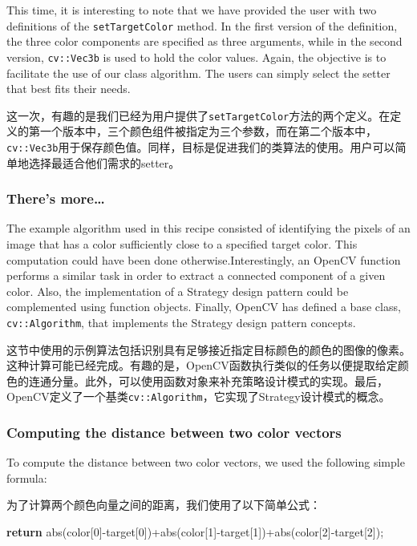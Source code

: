 \documentclass[]{article}
\newenvironment{Shaded}{}{}
\newcommand{\ControlFlowTok}[1]{\textcolor[rgb]{0.00,0.44,0.13}{\textbf{#1}}}
\newcommand{\DecValTok}[1]{\textcolor[rgb]{0.25,0.63,0.44}{#1}}
\newcommand{\NormalTok}[1]{#1}
\begin{document}
This time, it is interesting to note that we have provided the user with
two definitions of the \texttt{setTargetColor} method. In the first
version of the definition, the three color components are specified as
three arguments, while in the second version, \texttt{cv::Vec3b} is used
to hold the color values. Again, the objective is to facilitate the use
of our class algorithm. The users can simply select the setter that best
fits their needs.

这一次，有趣的是我们已经为用户提供了\texttt{setTargetColor}方法的两个定义。在定义的第一个版本中，三个颜色组件被指定为三个参数，而在第二个版本中，\texttt{cv::Vec3b}用于保存颜色值。同样，目标是促进我们的类算法的使用。用户可以简单地选择最适合他们需求的setter。

\hypertarget{header-n1211}{%
\subsubsection{There's more\ldots{}}\label{header-n1211}}

The example algorithm used in this recipe consisted of identifying the
pixels of an image that has a color sufficiently close to a specified
target color. This computation could have been done
otherwise.Interestingly, an OpenCV function performs a similar task in
order to extract a connected component of a given color. Also, the
implementation of a Strategy design pattern could be complemented using
function objects. Finally, OpenCV has defined a base class,
\texttt{cv::Algorithm}, that implements the Strategy design pattern
concepts.

这节中使用的示例算法包括识别具有足够接近指定目标颜色的颜色的图像的像素。这种计算可能已经完成。有趣的是，OpenCV函数执行类似的任务以便提取给定颜色的连通分量。此外，可以使用函数对象来补充策略设计模式的实现。最后，OpenCV定义了一个基类\texttt{cv::Algorithm}，它实现了Strategy设计模式的概念。

\hypertarget{header-n1214}{%
\subsubsection{Computing the distance between two color vectors
}\label{header-n1214}}

To compute the distance between two color vectors, we used the following
simple formula:

为了计算两个颜色向量之间的距离，我们使用了以下简单公式：

\begin{Shaded}
\begin{Highlighting}[]
\ControlFlowTok{return}\NormalTok{ abs(color[}\DecValTok{0}\NormalTok{]-target[}\DecValTok{0}\NormalTok{])+abs(color[}\DecValTok{1}\NormalTok{]-target[}\DecValTok{1}\NormalTok{])+abs(color[}\DecValTok{2}\NormalTok{]-target[}\DecValTok{2}\NormalTok{]);}
\end{Highlighting}
\end{Shaded}
\end{document}
